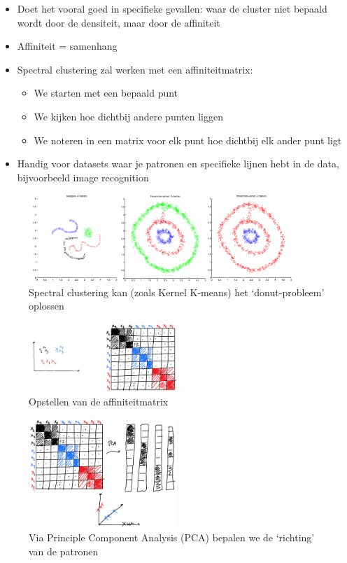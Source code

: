 \documentclass{article}
\begin{document}
\begin{itemize}
    \item Doet het vooral goed in specifieke gevallen: waar de cluster niet bepaald wordt door de densiteit, maar door de affiniteit
    \item Affiniteit = samenhang
    \item Spectral clustering zal werken met een affiniteitmatrix:
    \begin{itemize}
        \item We starten met een bepaald punt
        \item We kijken hoe dichtbij andere punten liggen
        \item We noteren in een matrix voor elk punt hoe dichtbij elk ander punt ligt
    \end{itemize}
    \item Handig voor datasets waar je patronen en specifieke lijnen hebt in de data, bijvoorbeeld image recognition
\end{itemize}

\begin{figure}[H]
    \centering
    \includegraphics[width=0.9\textwidth]{spectral-clustering.png}
    \caption{Spectral clustering kan (zoals Kernel K-means) het `donut-probleem' oplossen}
\end{figure}

\begin{figure}[H]
    \centering
    \includegraphics[width=0.5\textwidth]{spectral-clustering2.png}
    \caption{Opstellen van de affiniteitmatrix}
\end{figure}

\begin{figure}[H]
    \centering
    \includegraphics[width=0.5\textwidth]{spectral-clustering3.png}
    \caption{Via Principle Component Analysis (PCA) bepalen we de `richting' van de patronen}
\end{figure}
\end{document}

